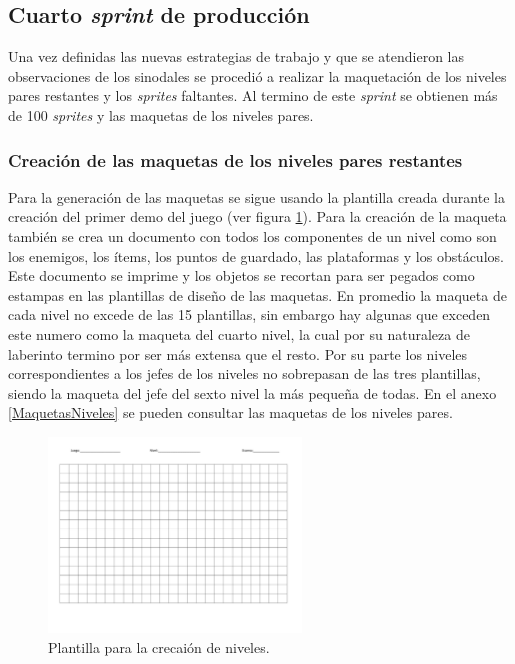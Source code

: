 \subsection{Cuarto \textit{sprint} de producción}
Una vez definidas las nuevas estrategias de trabajo y que se atendieron 
las observaciones de los sinodales se procedió a realizar la maquetación de los 
niveles pares restantes y los \textit{sprites} faltantes. Al termino de este 
\textit{sprint} se obtienen más de 100 \textit{sprites} y las maquetas de los 
niveles pares.

\subsubsection{Creación de las maquetas de los niveles pares restantes}
Para la generación de las maquetas se sigue usando la plantilla creada durante 
la creación del primer demo del juego (ver figura \ref{fig:MaquetaPlantilla}). 
Para la creación de la maqueta también se crea un documento con todos los 
componentes de un nivel como son los enemigos, los ítems, los puntos de guardado, 
las plataformas y los obstáculos. Este documento se imprime y los objetos se 
recortan para ser pegados como estampas en las plantillas de diseño de las 
maquetas. En promedio la maqueta de cada nivel no excede de las 15 plantillas, 
sin embargo hay algunas que exceden este numero como la maqueta del cuarto nivel, 
la cual por su naturaleza de laberinto termino por ser más extensa que el 
resto. Por su parte los niveles correspondientes a los jefes de los niveles no 
sobrepasan de las tres plantillas, siendo la maqueta del jefe del sexto nivel 
la más pequeña de todas. En el anexo \ref{MaquetasNiveles} se pueden consultar 
las maquetas de los niveles pares.  

\begin{figure}[h]
	\centering
	\includegraphics[width=0.6\textwidth]{03TrabajoRealizado/imagenes/maqueta-1.png}
 	\caption{Plantilla para la crecaión de niveles.}
	\label{fig:MaquetaPlantilla}		
\end{figure}

